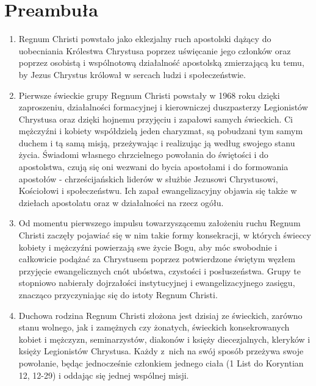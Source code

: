 \section*{Preambuła}
\begin{enumerate}


\item Regnum Christi powstało jako eklezjalny ruch apostolski dążący do uobecniania Królestwa Chrystusa poprzez uświęcanie jego członków oraz poprzez osobistą i wspólnotową działalność apostolską zmierzającą ku temu, by Jezus Chrystus królował w sercach ludzi i społeczeństwie. 


\item Pierwsze świeckie grupy Regnum Christi powstały w 1968 roku dzięki zaproszeniu, działalności formacyjnej i kierowniczej duszpasterzy Legionistów Chrystusa oraz dzięki hojnemu przyjęciu i zapałowi samych świeckich. Ci mężczyźni i kobiety współdzielą jeden charyzmat, są pobudzani tym samym duchem i tą samą misją, przeżywając i realizując ją według swojego stanu życia. Świadomi własnego chrzcielnego powołania do świętości i do apostolstwa, czują się oni wezwani do bycia apostołami i do formowania apostołów - chrześcijańskich liderów w służbie Jezusowi Chrystusowi, Kościołowi i społeczeństwu. Ich zapał ewangelizacyjny objawia się także w dziełach apostolatu oraz w działalności na rzecz ogółu.


\item Od momentu pierwszego impulsu towarzyszącemu założeniu ruchu Regnum Christi zaczęły pojawiać się w nim takie formy konsekracji, w których świeccy kobiety i mężczyźni powierzają swe życie Bogu, aby móc swobodnie i całkowicie podążać za Chrystusem poprzez potwierdzone świętym węzłem przyjęcie ewangelicznych cnót ubóstwa, czystości i posłuszeństwa. Grupy te stopniowo nabierały dojrzałości instytucyjnej i ewangelizacyjnego zasięgu, znacząco przyczyniając się do istoty Regnum Christi.


\item Duchowa rodzina Regnum Christi złożona jest dzisiaj ze świeckich, zarówno stanu wolnego, jak i zamężnych czy żonatych, świeckich konsekrowanych kobiet i mężczyzn, seminarzystów, diakonów i księży diecezjalnych, kleryków i księży Legionistów Chrystusa. Każdy \mbox{z nich} na swój sposób przeżywa swoje powołanie, będąc jednocześnie członkiem jednego ciała (1 List do Koryntian 12, 12-29) i oddając się jednej wspólnej misji.



\end{enumerate}
